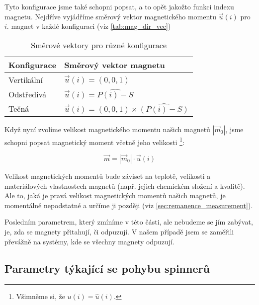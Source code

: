 Tyto konfigurace jsme také schopni popsat, a to opět jakožto funkci indexu magnetu.
Nejdříve vyjádříme směrový vektor magnetického momentu $\vec{u}(i)$ pro $i$. magnet v každé konfiguraci (viz \autoref{tab:mag_dir_vec})

\vspace{24pt}

\begin{table}[!ht]
    \captionsetup{justification=raggedright,singlelinecheck=off}
    \caption{Směrové vektory pro různé konfigurace}
    \label{tab:mag_dir_vec}

    \def\arraystretch{1.5}
    \begin{tabularx}{\textwidth}{p{} p{} }
        \textbf{Konfigurace} & \textbf{Směrový vektor magnetu}                    \\
        \hline
        Vertikální           & $\vec{u}(i) = (0,0,1)$                             \\
        Odstředivá           & $\vec{u}(i) = \widehat{P(i) - S}$                  \\
        Tečná                & $\vec{u}(i) = (0,0,1) \times \widehat{(P(i) - S)}$ \\
    \end{tabularx}
\end{table}

{\raggedright
Když nyní zvolíme velikost magnetického momentu našich magnetů $|\vec{m}_0|$, jsme schopni popsat magnetický moment včetně jeho velikosti \footnote{Všimněme si, že $u(i) = \hat{u}(i)$.}:}

\begin{equation}
    \label{eq:magnet_moment_orientation}
    \vec{m} = |\vec{m}_0| \cdot \vec{u}(i)
\end{equation}

Velikost magnetických momentů bude záviset na teplotě, velikosti a materiálových vlastnostech magnetů (např. jejich chemickém složení a kvalitě). Ale to, jaká je pravá velikost magnetických momentů našich magnetů, je momentálně nepodstatné a určíme ji později (viz \autoref{sec:remanence_measurement}).

Posledním parametrem, který zmíníme v této části, ale nebudeme se jím zabývat, je, zda se magnety přitahují, či odpuzují.
V našem případě jsem se zaměřili převážně na systémy, kde se všechny magnety odpuzují.

\subsection{Parametry týkající se pohybu spinnerů}
\label{sub:param_move}

